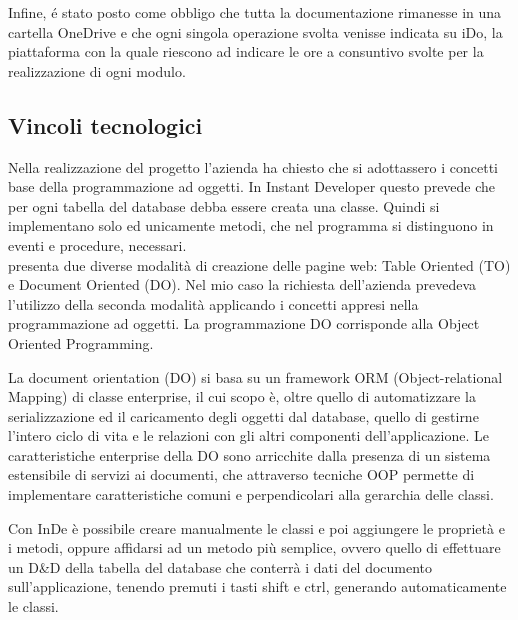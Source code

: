 Infine, é stato posto come obbligo che tutta la documentazione rimanesse in una cartella OneDrive e che ogni singola operazione svolta venisse indicata su iDo, la piattaforma con la quale riescono ad indicare le ore a consuntivo svolte per la realizzazione di ogni modulo.


\subsection{Vincoli tecnologici}\label{vincoliteconlogici}
Nella realizzazione del progetto l'azienda ha chiesto che si adottassero i concetti base della programmazione ad oggetti. In Instant Developer questo prevede che per ogni tabella del database debba essere creata una classe. Quindi si implementano solo ed unicamente metodi, che nel programma si distinguono in eventi e procedure, necessari. \\

\inde presenta due diverse modalità di creazione delle pagine web: Table Oriented (TO) e Document Oriented (DO). Nel mio caso la richiesta dell'azienda prevedeva l'utilizzo della seconda modalità applicando i concetti appresi nella programmazione ad oggetti. La programmazione DO corrisponde alla Object Oriented Programming.

La document orientation (DO) si basa su un framework ORM (Object-relational Mapping) di classe enterprise, il cui scopo è, oltre quello di automatizzare la serializzazione ed il caricamento degli oggetti dal database, quello di gestirne l'intero ciclo di vita e le relazioni con gli altri componenti dell'applicazione. Le caratteristiche enterprise della DO sono arricchite dalla presenza di un sistema estensibile di servizi ai documenti, che attraverso tecniche OOP permette di implementare caratteristiche comuni e perpendicolari alla gerarchia delle classi.

Con InDe è possibile creare manualmente le classi e poi aggiungere le proprietà e i metodi, oppure affidarsi ad un metodo più semplice, ovvero quello di effettuare un D\&D della tabella del database che conterrà i dati del documento sull'applicazione, tenendo premuti i tasti shift e ctrl, generando automaticamente le classi. 

